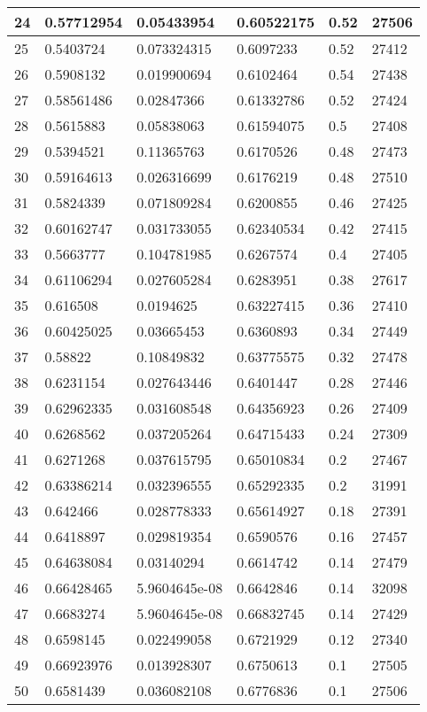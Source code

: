 \begin{longtable}{|l|l|l|l|l|l|}
24 & 0.57712954 & 0.05433954 & 0.60522175 & 0.52 & 27506 \\ \hline 
25 & 0.5403724 & 0.073324315 & 0.6097233 & 0.52 & 27412 \\ \hline 
26 & 0.5908132 & 0.019900694 & 0.6102464 & 0.54 & 27438 \\ \hline 
27 & 0.58561486 & 0.02847366 & 0.61332786 & 0.52 & 27424 \\ \hline 
28 & 0.5615883 & 0.05838063 & 0.61594075 & 0.5 & 27408 \\ \hline 
29 & 0.5394521 & 0.11365763 & 0.6170526 & 0.48 & 27473 \\ \hline 
30 & 0.59164613 & 0.026316699 & 0.6176219 & 0.48 & 27510 \\ \hline 
31 & 0.5824339 & 0.071809284 & 0.6200855 & 0.46 & 27425 \\ \hline 
32 & 0.60162747 & 0.031733055 & 0.62340534 & 0.42 & 27415 \\ \hline 
33 & 0.5663777 & 0.104781985 & 0.6267574 & 0.4 & 27405 \\ \hline 
34 & 0.61106294 & 0.027605284 & 0.6283951 & 0.38 & 27617 \\ \hline 
35 & 0.616508 & 0.0194625 & 0.63227415 & 0.36 & 27410 \\ \hline 
36 & 0.60425025 & 0.03665453 & 0.6360893 & 0.34 & 27449 \\ \hline 
37 & 0.58822 & 0.10849832 & 0.63775575 & 0.32 & 27478 \\ \hline 
38 & 0.6231154 & 0.027643446 & 0.6401447 & 0.28 & 27446 \\ \hline 
39 & 0.62962335 & 0.031608548 & 0.64356923 & 0.26 & 27409 \\ \hline 
40 & 0.6268562 & 0.037205264 & 0.64715433 & 0.24 & 27309 \\ \hline 
41 & 0.6271268 & 0.037615795 & 0.65010834 & 0.2 & 27467 \\ \hline 
42 & 0.63386214 & 0.032396555 & 0.65292335 & 0.2 & 31991 \\ \hline 
43 & 0.642466 & 0.028778333 & 0.65614927 & 0.18 & 27391 \\ \hline 
44 & 0.6418897 & 0.029819354 & 0.6590576 & 0.16 & 27457 \\ \hline 
45 & 0.64638084 & 0.03140294 & 0.6614742 & 0.14 & 27479 \\ \hline 
46 & 0.66428465 & 5.9604645e-08 & 0.6642846 & 0.14 & 32098 \\ \hline 
47 & 0.6683274 & 5.9604645e-08 & 0.66832745 & 0.14 & 27429 \\ \hline 
48 & 0.6598145 & 0.022499058 & 0.6721929 & 0.12 & 27340 \\ \hline 
49 & 0.66923976 & 0.013928307 & 0.6750613 & 0.1 & 27505 \\ \hline 
50 & 0.6581439 & 0.036082108 & 0.6776836 & 0.1 & 27506 \\ \hline 
\end{longtable}